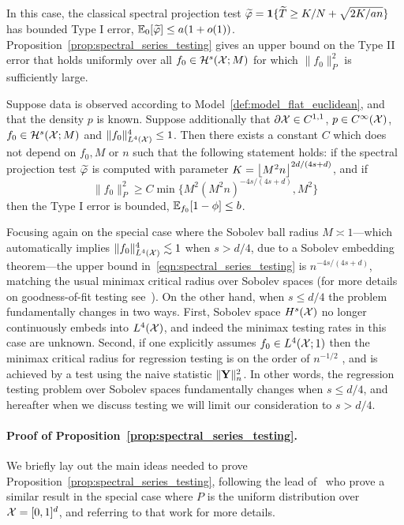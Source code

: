 In this case, the classical spectral projection test $\widetilde{\varphi} = \mathbf{1}\{\widetilde{T} \geq K/N + \sqrt{2K/an}\}$ has bounded Type I error, $\mathbb{E}_{0}[\widetilde{\varphi}] \leq a (1 + o(1))$. Proposition~\ref{prop:spectral_series_testing} gives an upper bound on the Type II error that holds uniformly over all $f_0 \in \mathcal{H}^s(\mathcal{X};M)$ for which $\|f_0\|_P^2$ is sufficiently large.
\begin{proposition}
	\label{prop:spectral_series_testing}
	Suppose data is observed according to Model~\ref{def:model_flat_euclidean}, and that the density $p$ is known.  Suppose additionally that $\partial \mathcal{X} \in C^{1,1}$, $p \in C^{\infty}(\mathcal{X})$, $f_0 \in \mathcal{H}^{s}(\mathcal{X};M)$ and $\|f_0\|_{L^4(\mathcal{X})}^4 \leq 1$. Then there exists a constant $C$ which does not depend on $f_0,M$ or $n$ such that the following statement holds: if the spectral projection test $\widetilde{\varphi}$ is computed with parameter $K = \left\lfloor M^2n \right\rfloor^{2d/(4s + d)}$, and if
	\begin{equation}
	\label{eqn:spectral_series_testing}
	\|f_0\|_P^2 \geq C\min\{M^2(M^2n)^{-4s/(4s + d)}, M^2\}
	\end{equation}
	then the Type I error is bounded, $\mathbb{E}_{f_0}[1 - \phi] \leq b$.
\end{proposition}
Focusing again on the special case where the Sobolev ball radius $M \asymp 1$---which automatically implies $\|f_0\|_{L^4(\mathcal{X})}^4 \lesssim 1$ when $s > d/4$, due to a Sobolev embedding theorem---the upper bound in~\eqref{eqn:spectral_series_testing} is $n^{-4s/(4s + d)}$, matching the usual minimax critical radius over Sobolev spaces (for more details on goodness-of-fit testing see~\cite{ingster2009,ingster2012}). On the other hand, when $s \leq d/4$ the problem fundamentally changes in two ways. First, Sobolev space $H^s(\mathcal{X})$ no longer continuously embeds into $L^4(\mathcal{X})$, and indeed the minimax testing rates in this case are unknown. Second, if one explicitly assumes $f_0 \in L^4(\mathcal{X};1)$ then the minimax critical radius for regression testing is on the order of $n^{-1/2}$ \citep{guerre02}, and is achieved by a test using the naive statistic $\|{\bf Y}\|_n^2$. In other words, the regression testing problem over Sobolev spaces fundamentally changes when $s \leq d/4$, and hereafter when we discuss testing we will limit our consideration to $s > d/4$. 
\paragraph{Proof of Proposition~\ref{prop:spectral_series_testing}.}
We briefly lay out the main ideas needed to prove Proposition~\ref{prop:spectral_series_testing}, following the lead of~\cite{ingster2009} who prove a similar result in the special case where $P$ is the uniform distribution over $\mathcal{X} = [0,1]^d$, and referring to that work for more details.

